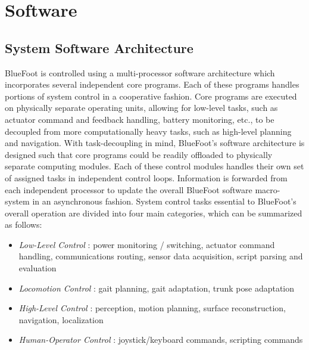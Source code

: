 \label{ch::software}
\chapter{Software}
	
	\section{System Software Architecture}
	
	BlueFoot is controlled using a multi-processor software architecture which incorporates several independent core programs. Each of these programs handles portions of system control in a cooperative fashion. Core programs are executed on physically separate operating units, allowing for low-level tasks, such as actuator command and feedback handling, battery monitoring, etc., to be decoupled from more computationally heavy tasks, such as high-level planning and navigation. With task-decoupling in mind, BlueFoot's software architecture is designed such that core programs could be readily offloaded to physically separate computing modules. Each of these control modules handles their own set of assigned tasks in independent control loops. Information is forwarded from each independent processor to update the overall BlueFoot software macro-system in an asynchronous fashion. System control tasks essential to BlueFoot's overall operation are divided into four main categories, which can be summarized as follows:
		\begin{itemize}
			\item{
			\emph{Low-Level Control} : 
				power monitoring / switching, 
				actuator command handling, 
				communications routing,
				sensor data acquisition,
				script parsing and evaluation
			}
			\item{
			\emph{Locomotion Control} : 
				gait planning, 
				gait adaptation, 
				trunk pose adaptation
			}
			\item{
			\emph{High-Level Control} : 
				perception, 
				motion planning, 
				surface reconstruction, 
				navigation, 
				localization
			}
			\item{
			\emph{Human-Operator Control} : 
				joystick/keyboard commands,
				scripting commands
			}
		\end{itemize}
